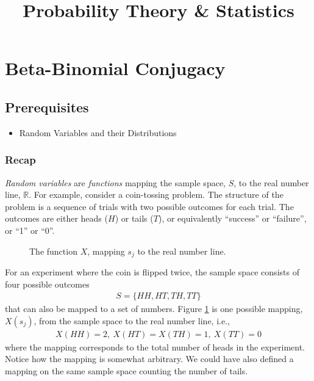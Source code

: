 \documentclass[11pt,a4paper]{article}
\title{Probability Theory \& Statistics}
\begin{document}
\maketitle
\newpage


\section{Beta-Binomial Conjugacy}

\subsection{Prerequisites}

\begin{itemize}
\item
Random Variables and their Distributions
\end{itemize}

\subsubsection{Recap}

\emph{Random variables} are \emph{functions} 
mapping the sample space, \(S\), 
to the real number line, \(\mathbb{R}\). 
For example, 
consider a coin-tossing problem. 
The structure of the problem is a sequence of trials 
with two possible outcomes for each trial. 
The outcomes are either heads (\(H\)) or tails (\(T\)), 
or equivalently ``success'' or ``failure'', 
or ``1'' or ``0''.

\begin{figure}[h!]
\centering

\caption{The function \(X\), mapping \(s_{j}\) to the real number line.}
\label{fig:mapping}
\end{figure}

For an experiment where the coin is flipped twice, 
the sample space consists of four possible outcomes
\begin{align}
S = \{HH, HT,TH, TT\}
\end{align}
that can also be mapped to a set of numbers. 
Figure \ref{fig:mapping} is one possible mapping, \(X(s_{j})\), 
from the sample space to the real number line, i.e.,
\begin{align}
X(HH) = 2,\ X(HT) = X(TH) = 1,\ X(TT) = 0
\end{align}
where the mapping corresponds 
to the total number of heads in the experiment. 
Notice how the mapping is somewhat arbitrary. 
We could have also defined a mapping on 
the same sample space counting the number of tails.
\end{document}

